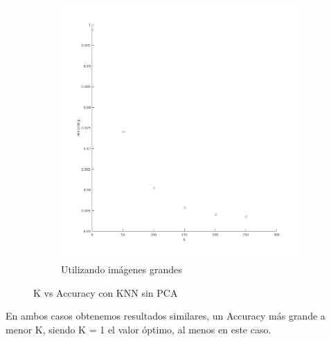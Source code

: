 \begin{figure}[H]
\begin{subfigure}[h]{0.62\linewidth}
\includegraphics[width=\linewidth]{img/big_k_knn_accu.png}
\caption{Utilizando imágenes grandes}
\end{subfigure}%
\caption{K vs Accuracy con KNN sin PCA}
\end{figure}

En ambos casos obtenemos resultados similares, un Accuracy más grande a menor K, siendo K = 1 el valor óptimo, al menos en este caso.


